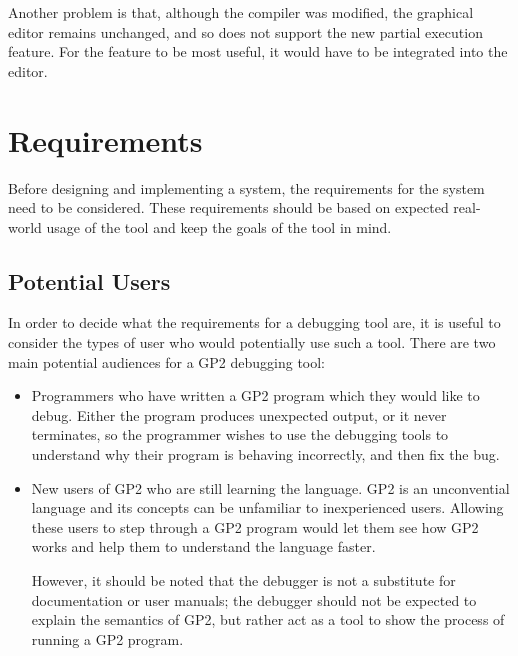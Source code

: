 \documentclass[authoryearcitations]{UoYCSproject}
\begin{document}
Another problem is that, although the compiler was modified, the graphical editor
remains unchanged, and so does not support the new partial execution feature.
For the feature to be most useful, it would have to be integrated into the editor.


\clearpage


\chapter{Requirements}
\label{cha:Requirements}

Before designing and implementing a system, the requirements for the system need
to be considered. These requirements should be based on expected real-world usage
of the tool and keep the goals of the tool in mind.

\section{Potential Users}
\label{sec:Potential Users}

In order to decide what the requirements for a debugging tool are, it is useful
to consider the types of user who would potentially use such a tool. There are
two main potential audiences for a GP2 debugging tool:

\begin{itemize}
    \item Programmers who have written a GP2 program which they would like to
          debug. Either the program produces unexpected output, or it never
          terminates, so the programmer wishes to use the debugging tools to
          understand why their program is behaving incorrectly, and then fix the
          bug.

    \item New users of GP2 who are still learning the language. GP2 is an
          unconvential language and its concepts can be unfamiliar to
          inexperienced users. Allowing these users to step through a GP2
          program would let them see how GP2 works and help them to understand
          the language faster.

          However, it should be noted that the debugger is not a substitute for
          documentation or user manuals; the debugger should not be expected to
          explain the semantics of GP2, but rather act as a tool to show the
          process of running a GP2 program.
\end{itemize}
\end{document}
